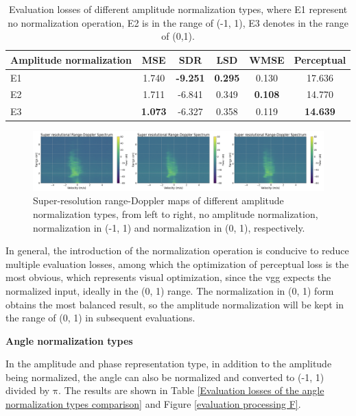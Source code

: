 \begin{table}
    \centering
    \caption{Evaluation losses of different amplitude normalization types, where E1 represent no normalization operation, E2 is in the range of (-1, 1), E3 denotes in the range of (0,1).}
    \label{Evaluation losses of the amplitude normalization types comparison in the case of no angle normalization}
    \begin{tabular}{l|c|c|c|c|c}
        \hline
        Amplitude normalization & MSE & SDR & LSD & WMSE & Perceptual \\
        \hline
        E1 & 1.740 & \textbf{-9.251} & \textbf{0.295} & 0.130 & 17.636 \\
        \hline
        E2 & 1.711 & -6.841 & 0.349 & \textbf{0.108} & 14.770 \\
        \hline
        E3 & \textbf{1.073} & -6.327 & 0.358 & 0.119 & \textbf{14.639} \\
        \hline
    \end{tabular}
\end{table}

\begin{figure}
    \centering
    \includegraphics[scale=.45]{figures/evaluation_processing_E.png}
    \caption{Super-resolution range-Doppler maps of different amplitude normalization types, from left to right, no amplitude normalization, normalization in (-1, 1) and normalization in (0, 1), respectively.}
    \label{evaluation processing E}
\end{figure}

In general, the introduction of the normalization operation is conducive to reduce multiple evaluation losses, among which the optimization of perceptual loss is the most obvious, which represents visual optimization, since the \gls{vgg} expects the normalized input, ideally in the (0, 1) range. The normalization in (0, 1) form obtains the most balanced result, so the amplitude normalization will be kept in the range of (0, 1) in subsequent evaluations.

\begin{spacing}{1.5}
\textbf{\large{Angle normalization types}}
\end{spacing}
In the amplitude and phase representation type, in addition to the amplitude being normalized, the angle can also be normalized and converted to (-1, 1) divided by  $\mathrm{\pi}$. The results are shown in Table \ref{Evaluation losses of the angle normalization types comparison} and Figure \ref{evaluation processing F}.

